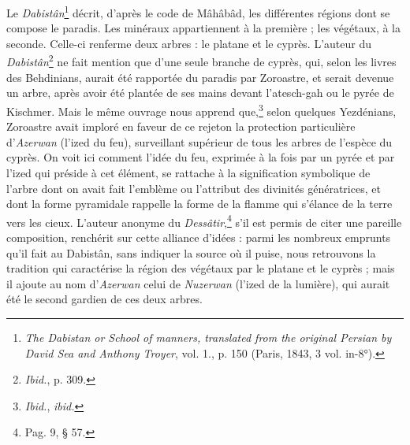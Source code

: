 \documentclass[a4paper, 11pt, oneside, polutonikogreek, french]{article}
\begin{document}
Le \emph{Dabistân}\footnote{\emph{The Dabistan or School of manners, translated from the original Persian by David Sea and Anthony Troyer}, vol. 1., p. 150 (Paris, 1843, 3 vol. in-8°).} décrit, d'après le code de Mâhâbâd, les différentes régions dont se compose le paradis. Les minéraux appartiennent à la première ; les végétaux, à la seconde. Celle-ci renferme deux arbres : le platane et le cyprès. L'auteur du \emph{Dabistân}\footnote{\emph{Ibid.}, p. 309.} ne fait mention que d'une seule branche de cyprès, qui, selon les livres des Behdinians, aurait été rapportée du paradis par Zoroastre, et serait devenue un arbre, après avoir été plantée de ses mains devant l'atesch-gah ou le pyrée de Kischmer. Mais le même ouvrage nous apprend que,\footnote{\emph{Ibid.}, \emph{ibid.}} selon quelques Yezdénians, Zoroastre avait imploré en faveur de ce rejeton la protection particulière d'\emph{Azerwan} (l'ized du feu), surveillant supérieur de tous les arbres de l'espèce du cyprès. On voit ici comment l'idée du feu, exprimée à la fois par un pyrée et par l'ized qui préside à cet élément, se rattache à la signification symbolique de l'arbre dont on avait fait l'emblème ou l'attribut des divinités génératrices, et dont la forme pyramidale rappelle la forme de la flamme qui s'élance de la terre vers les cieux. L'auteur anonyme du \emph{Dessâtir},\footnote{Pag. 9, § 57.} s'il est permis de citer une pareille composition, renchérit sur cette alliance d'idées : parmi les nombreux emprunts qu'il fait au Dabistân, sans indiquer la source où il puise, nous retrouvons la tradition qui caractérise la région des végétaux par le platane et le cyprès ; mais il ajoute au nom d'\emph{Azerwan} celui de \emph{Nuzerwan} (l'ized de la lumière), qui aurait été le second gardien de ces deux arbres.
\end{document}
